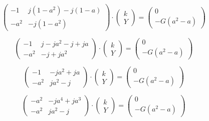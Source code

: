 \documentclass{article}
\begin{document}
$$
    \begin{pmatrix}
        -1   & j (1 - a^2) - j (1 - a) \\
        -a^2 & - j (1 - a^2)
    \end{pmatrix}
    \cdot
    \begin{pmatrix}
        k \\
        Y
    \end{pmatrix}
    =
    \begin{pmatrix}
        0 \\
        -G (a^2 - a)
    \end{pmatrix}
$$

$$
    \begin{pmatrix}
        -1   & j - j a^2 - j + j a \\
        -a^2 & - j + j a^2
    \end{pmatrix}
    \cdot
    \begin{pmatrix}
        k \\
        Y
    \end{pmatrix}
    =
    \begin{pmatrix}
        0 \\
        - G (a^2 - a)
    \end{pmatrix}
$$

$$
    \begin{pmatrix}
        -1   & - j a^2 + j a \\
        -a^2 & j a^2 - j
    \end{pmatrix}
    \cdot
    \begin{pmatrix}
        k \\
        Y
    \end{pmatrix}
    =
    \begin{pmatrix}
        0 \\
        - G (a^2 - a)
    \end{pmatrix}
$$

$$
    \begin{pmatrix}
        -a^2 & - j a^4 + j a^3 \\
        -a^2 & j a^2 - j
    \end{pmatrix}
    \cdot
    \begin{pmatrix}
        k \\
        Y
    \end{pmatrix}
    =
    \begin{pmatrix}
        0 \\
        - G (a^2 - a)
    \end{pmatrix}
$$
\end{document}
